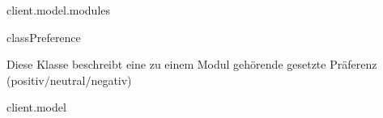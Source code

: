 \begin{texdocpackage}{client.model.modules}
\begin{texdocclass}{class}{Preference}
\label{texdoclet:edu.kit.informatik.studyplan.client.model.modules.Preference}
\begin{texdocclassintro}
Diese Klasse beschreibt eine zu einem Modul gehörende gesetzte Präferenz
 (positiv$/$neutral$/$negativ)\end{texdocclassintro}
\begin{texdocclassfields}
\end{texdocclassfields}
\begin{texdocclassconstructors}
\end{texdocclassconstructors}
\begin{texdocclassmethods}
\end{texdocclassmethods}
\end{texdocclass}


\end{texdocpackage}



\begin{texdocpackage}{client.model}
\label{texdoclet:edu.kit.informatik.studyplan.client.model}

\end{texdocpackage}



